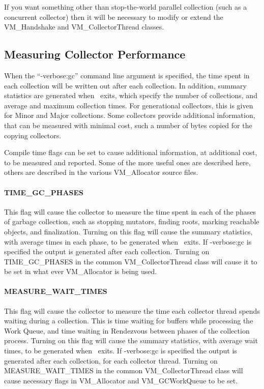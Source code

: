 If you want something other than stop-the-world parallel collection 
(such as a concurrent collector) then it will be necessary to modify
or extend the VM\_Handshake and VM\_CollectorThread classes.

\subsection{Measuring Collector Performance} \label{sssec:verbosegc}
When the ``-verbose:gc'' command line argument is specified, the time
spent in each collection will be written out after each collection.
In addition, summary statistics are generated when \jp\ exits, which
specify the number of collections, and average and maximum collection times.
For generational collectors, this is given for Minor and Major collections.
Some collectors provide additional information, that can be measured
with minimal cost, such a number of bytes copied for the copying collectors.

Compile time flags can be set to cause additional information, at additional
cost, to be measured and reported.  Some of the more useful ones are
described here, others are described in the various VM\_Allocator
source files.

\paragraph{TIME\_GC\_PHASES}
This flag will cause the collector to measure the time spent in each
of the phases of garbage collection, such as stopping mutators, finding roots,
marking reachable objects, and finalization.  Turning on this flag will cause
the summary statistics, with average times in each phase, to be generated 
when \jp\ exits.  If -verbose:gc is specified the output is generated after
each collection. Turning on TIME\_GC\_PHASES in the common VM\_CollectorThread
class will cause it to be set in what ever VM\_Allocator is being used.

\paragraph{MEASURE\_WAIT\_TIMES}
This flag will cause the collector to measure the time each collector thread
spends waiting during a collection.  This is time waiting for buffers while
processing the Work Queue, and time waiting in Rendezvous between phases of the
collection process. Turning on this flag will cause
the summary statistics, with average wait times, to be generated 
when \jp\ exits.  If -verbose:gc is specified the output is generated after
each collection, for each collector thread.
Turning on MEASURE\_WAIT\_TIMES in the common VM\_CollectorThread
class will cause necessary flags in VM\_Allocator and VM\_GCWorkQueue to be set.

